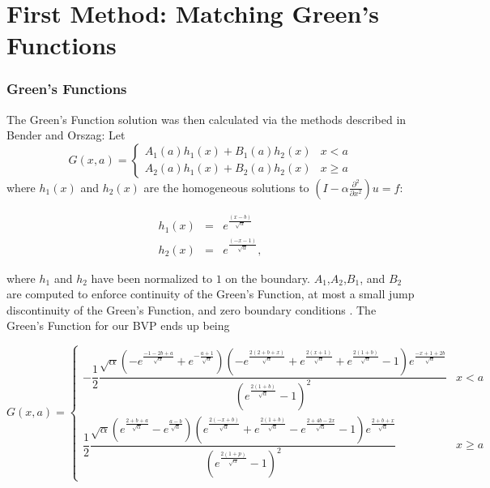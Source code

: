 \documentclass[11pt]{amsart}
\begin{document}
\section{First Method: Matching Green's Functions}
\subsubsection{Green's Functions}
The Green's Function solution was then calculated via the methods described in Bender and Orszag: Let 
\begin{equation}
G(x,a)=\begin{cases}
A_1(a)h_1(x)+B_1(a)h_2(x) & x<a \\
A_2(a)h_1(x)+B_2(a)h_2(x) & x \geq a
\end{cases}
\end{equation}
where $h_1(x)$ and $h_2(x)$ are the homogeneous solutions to  $(I-\alpha \frac{\partial^2}{\partial x^2})u=f$:

\begin{eqnarray}
h_1(x) &=& e^{\frac{(x-b)}{\sqrt{\alpha}}} \\
h_2(x) &=& e^{\frac{(-x-1)}{\sqrt{\alpha}}},
\end{eqnarray}

where $h_1$ and $h_2$ have been normalized to $1$ on the boundary.  $A_1$,$A_2$,$B_1$, and $B_2$ are computed to enforce continuity of the Green's Function, at most a small jump discontinuity of the Green's Function, and zero boundary conditions \cite{BO}.  The Green's Function for our BVP ends up being

\begin{equation}
G(x,a)=\begin{cases} 
-\dfrac{1}{2} \dfrac{\sqrt{\alpha}\left(-e^{\frac{-1-2b+a}{\sqrt{\alpha}}}+e^{-\frac{a+1}{\sqrt{\alpha}}}\right)\left(-e^{\frac{2(2+b+x)}{\sqrt{\alpha}}}+e^{\frac{2(x+1)}{\sqrt{\alpha}}}+e^{\frac{2(1+b)}{\sqrt{\alpha}}}-1\right)e^{\frac{-x+1+2b}{\sqrt{\alpha}}}}{\left(e^{\frac{2(1+b)}{\sqrt{\alpha}}}-1\right)^2} & x<a \\
\dfrac{1}{2} \dfrac{\sqrt{\alpha} \left(e^{\frac{2+b+a}{\sqrt{\alpha}}} -e^{\frac{a-b}{\sqrt{\alpha}}}\right)\left(e^{\frac{2(-x+b)}{\sqrt{\alpha}}}+e^{\frac{2(1+b)}{\sqrt{\alpha}}}-e^{\frac{2+4b-2x}{\sqrt{\alpha}}}-1\right)e^{\frac{2+b+x}{\sqrt{\alpha}}}}{\left(e^{\frac{2(1+p)}{\sqrt{\alpha}}}-1\right)^2} & x \geq a

\end{cases}
\end{equation}
\end{document}
